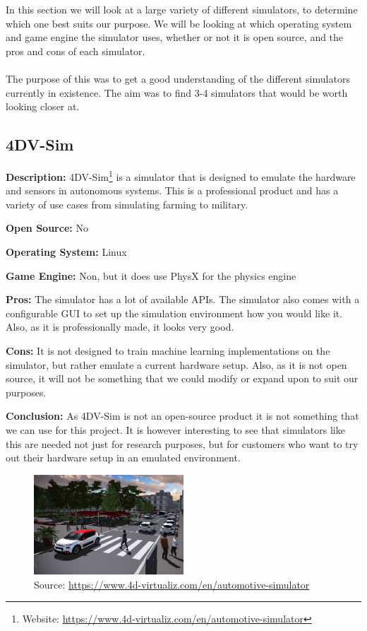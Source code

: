 In this section we will look at a large variety of different simulators, to determine which one best suits our purpose. We will be looking at which operating system and game engine the simulator uses, whether or not it is open source, and the pros and cons of each simulator. 
\\~\\
The purpose of this was to get a good understanding of the different simulators currently in existence. The aim was to find 3-4 simulators that would be worth looking closer at.

\subsection{4DV-Sim}
\textbf{Description:} 4DV-Sim\footnote{Website: \url{https://www.4d-virtualiz.com/en/automotive-simulator}} is a simulator that is designed to emulate the hardware and sensors in autonomous systems. This is a professional product and has a variety of use cases from simulating farming to military.

\textbf{Open Source:} No

\textbf{Operating System:} Linux

\textbf{Game Engine:} Non, but it does use PhysX for the physics engine

\textbf{Pros:} The simulator has a lot of available APIs. The simulator also comes with a configurable GUI to set up the simulation environment how you would like it. Also, as it is professionally made, it looks very good.   

\textbf{Cons:} It is not designed to train machine learning implementations on the simulator, but rather emulate a current hardware setup. Also, as it is not open source, it will not be something that we could modify or expand upon to suit our purposes. 

\textbf{Conclusion:} As 4DV-Sim is not an open-source product it is not something that we can use for this project. It is however interesting to see that simulators like this are needed not just for research purposes, but for customers who want to try out their hardware setup in an emulated environment.


\begin{figure}[H]
    \centering
    \includegraphics[width=0.5\textwidth]{Simulators/4DV-Sim.jpg}
    \caption{Source: \url{https://www.4d-virtualiz.com/en/automotive-simulator}}
\end{figure}

